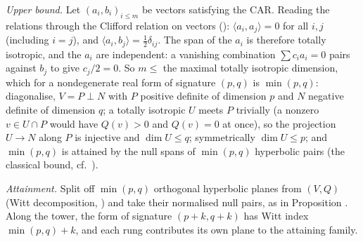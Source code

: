\emph{Upper bound.} Let $(a_i, b_i)_{i \leq m}$ be vectors satisfying the CAR. Reading the relations through the Clifford relation on vectors (): $\langle a_i, a_j \rangle = 0$ for all $i, j$ (including $i = j$), and $\langle a_i, b_j \rangle = \tfrac12 \delta_{ij}$. The span of the $a_i$ is therefore totally isotropic, and the $a_i$ are independent: a vanishing combination $\sum c_i a_i = 0$ pairs against $b_j$ to give $c_j/2 = 0$. So $m \leq$ the maximal totally isotropic dimension, which for a nondegenerate real form of signature $(p,q)$ is $\min(p,q)$: diagonalise, $V = P \perp N$ with $P$ positive definite of dimension $p$ and $N$ negative definite of dimension $q$; a totally isotropic $U$ meets $P$ trivially (a nonzero $v \in U \cap P$ would have $Q(v) > 0$ and $Q(v) = 0$ at once), so the projection $U \to N$ along $P$ is injective and $\dim U \leq q$; symmetrically $\dim U \leq p$; and $\min(p,q)$ is attained by the null spans of $\min(p,q)$ hyperbolic pairs (the classical bound, cf.\ \cite[Ch.~I]{Lam2005}).

\emph{Attainment.} Split off $\min(p,q)$ orthogonal hyperbolic planes from $(V, Q)$ (Witt decomposition, ) and take their normalised null pairs, as in Proposition . Along the tower, the form of signature $(p{+}k, q{+}k)$ has Witt index $\min(p,q) + k$, and each rung contributes its own plane to the attaining family.

